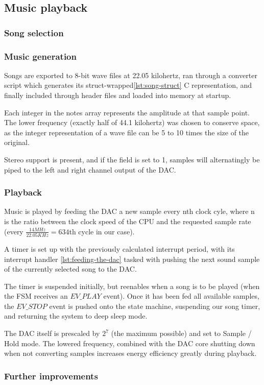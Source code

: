 \subsection{Music playback}

\subsubsection{Song selection}

\subsubsection{Music generation}

Songs are exported to 8-bit wave files at 22.05 kilohertz,
ran through a converter script which generates its struct-wrapped\ref{lst:song-struct} C
representation, and finally included through header files and loaded into memory at startup.



Each integer in the notes array represents the amplitude at that sample point.
The lower frequency (exactly half of 44.1 kilohertz) was chosen to conserve space, as the integer representation of a wave file can be 5 to 10 times the size of the original.

Stereo support is present, and if the field is set to 1, samples will alternatingly be piped to the left and right channel output of the DAC.

\subsubsection{Playback}

Music is played by feeding the DAC a new sample every nth clock cyle, where n is the ratio between the clock speed of the CPU and the requested sample rate (every $ \frac{14 MHz}{22.05 KHz} = 634 $th cycle in our case).

A timer is set up with the previously calculated interrupt period, with its interrupt handler \ref{lst:feeding-the-dac} tasked with pushing the next sound sample of the currently selected song to the DAC.

The timer is suspended initially, but reenables when a song is to be played (when the FSM receives an $ EV\_PLAY $ event).
Once it has been fed all available samples, the $ EV\_STOP $ event is pushed onto the state machine, suspending our song timer, and returning the system to deep sleep mode.



The DAC itself is prescaled by $ 2^{7} $ (the maximum possible) and set to Sample / Hold mode.
The lowered frequency, combined with the DAC core shutting down when not converting samples increases energy efficiency greatly during playback\cite{referencemanual}.

\subsubsection{Further improvements}

